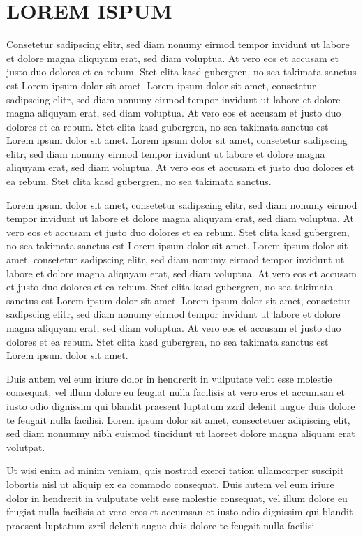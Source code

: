 \documentclass[]{../metanetpaper}
\begin{document}
\section{LOREM ISPUM}
Consetetur sadipscing elitr, sed diam nonumy eirmod tempor invidunt ut labore et dolore magna aliquyam erat, sed diam voluptua. At vero eos et accusam et justo duo dolores et ea rebum. Stet clita kasd gubergren, no sea takimata sanctus est Lorem ipsum dolor sit amet. Lorem ipsum dolor sit amet, consetetur sadipscing elitr, sed diam nonumy eirmod tempor invidunt ut labore et dolore magna aliquyam erat, sed diam voluptua. At vero eos et accusam et justo duo dolores et ea rebum. Stet clita kasd gubergren, no sea takimata sanctus est Lorem ipsum dolor sit amet. Lorem ipsum dolor sit amet, consetetur sadipscing elitr, sed diam nonumy eirmod tempor invidunt ut labore et dolore magna aliquyam erat, sed diam voluptua. At vero eos et accusam et justo duo dolores et ea rebum. Stet clita kasd gubergren, no sea takimata sanctus.   

Lorem ipsum dolor sit amet, consetetur sadipscing elitr, sed diam nonumy eirmod tempor invidunt ut labore et dolore magna aliquyam erat, sed diam voluptua. At vero eos et accusam et justo duo dolores et ea rebum. Stet clita kasd gubergren, no sea takimata sanctus est Lorem ipsum dolor sit amet. Lorem ipsum dolor sit amet, consetetur sadipscing elitr, sed diam nonumy eirmod tempor invidunt ut labore et dolore magna aliquyam erat, sed diam voluptua. At vero eos et accusam et justo duo dolores et ea rebum. Stet clita kasd gubergren, no sea takimata sanctus est Lorem ipsum dolor sit amet. Lorem ipsum dolor sit amet, consetetur sadipscing elitr, sed diam nonumy eirmod tempor invidunt ut labore et dolore magna aliquyam erat, sed diam voluptua. At vero eos et accusam et justo duo dolores et ea rebum. Stet clita kasd gubergren, no sea takimata sanctus est Lorem ipsum dolor sit amet.   

Duis autem vel eum iriure dolor in hendrerit in vulputate velit esse molestie consequat, vel illum dolore eu feugiat nulla facilisis at vero eros et accumsan et iusto odio dignissim qui blandit praesent luptatum zzril delenit augue duis dolore te feugait nulla facilisi. Lorem ipsum dolor sit amet, consectetuer adipiscing elit, sed diam nonummy nibh euismod tincidunt ut laoreet dolore magna aliquam erat volutpat.   

Ut wisi enim ad minim veniam, quis nostrud exerci tation ullamcorper suscipit lobortis nisl ut aliquip ex ea commodo consequat. Duis autem vel eum iriure dolor in hendrerit in vulputate velit esse molestie consequat, vel illum dolore eu feugiat nulla facilisis at vero eros et accumsan et iusto odio dignissim qui blandit praesent luptatum zzril delenit augue duis dolore te feugait nulla facilisi.   
\end{document}
